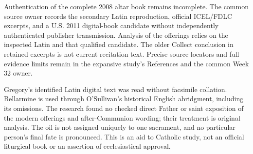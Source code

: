 Authentication of the complete 2008 altar book remains incomplete. The common source owner records the secondary Latin reproduction, official ICEL/FDLC excerpts, and a U.S. 2011 digital-book candidate without independently authenticated publisher transmission. Analysis of the offerings relies on the inspected Latin and that qualified candidate. The older Collect conclusion in retained excerpts is not current recitation text. Precise source locators and full evidence limits remain in the expansive study's References and the common Week 32 owner.

Gregory's identified Latin digital text was read without facsimile collation. Bellarmine is used through O'Sullivan's historical English abridgment, including its omissions. The research found no checked direct Father or saint exposition of the modern offerings and after-Communion wording; their treatment is original analysis. The oil is not assigned uniquely to one sacrament, and no particular person's final fate is pronounced. This is an aid to Catholic study, not an official liturgical book or an assertion of ecclesiastical approval.

